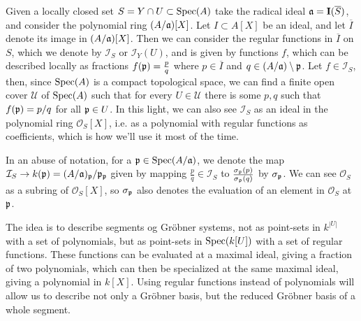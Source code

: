 Given a locally closed set $S = Y \cap U \subset \operatorname{Spec}(A)$ take the radical ideal $\mathfrak{a} = \operatorname{\mathbf I}(\overline S)$, and consider the polynomial ring $(A/\mathfrak{a})[X]$. Let $I \subset A[X]$ be an ideal, and let $\overline I$ denote its image in $(A/\mathfrak{a})[X]$. Then we can consider the regular functions in $\overline I$ on $S$, which we denote by $\mathcal I_{S}$ or $\mathcal I_{Y}(U)$, and is given by functions $f$, which can be described locally as fractions $f(\mathfrak p) = \frac p q$ where $p \in \overline I$ and $q \in (A/\mathfrak{a}) \setminus \mathfrak p$. Let $f \in \mathcal I_{S}$, then, since $\operatorname{Spec}(A)$ is a compact topological space, we can find a finite open cover $\mathcal U$ of $\operatorname{Spec}(A)$ such that for every $U \in \mathcal U$ there is some $p, q$ such that $f(\mathfrak p) = p/q$ for all $\mathfrak p \in U$. In this light, we can also see $\mathcal I_{S}$ as an ideal in the polynomial ring $\mathcal O_{S}[X]$, i.e. as a polynomial with regular functions as coefficients, which is how we'll use it most of the time.

In an abuse of notation, for a $\mathfrak p \in \operatorname{Spec}(A/\mathfrak{a})$, we denote the map $\mathcal I_{S} \to k(\mathfrak p) = (A/\mathfrak{a})_{\mathfrak p}/\mathfrak p_{\mathfrak p}$ given by mapping $\frac p q \in \mathcal I_{S}$ to $\frac{\sigma_{\mathfrak p}(p)}{\sigma_{\mathfrak p}(q)}$ by $\sigma_{\mathfrak p}$. We can see $\mathcal O_{S}$ as a subring of $\mathcal O_{S}[X]$, so $\sigma_{\mathfrak p}$ also denotes the evaluation of an element in $\mathcal O_{S}$ at $\mathfrak p$.

The idea is to describe segments og Gröbner systems, not as point-sets in $k^{|U|}$ with a set of polynomials, but as point-sets in $\operatorname{Spec}(k[U])$ with a set of regular functions. These functions can be evaluated at a maximal ideal, giving a fraction of two polynomials, which can then be specialized at the same maximal ideal, giving a polynomial in $k[X]$. Using regular functions instead of polynomials will allow us to describe not only a Gröbner basis, but the reduced Gröbner basis of a whole segment.

